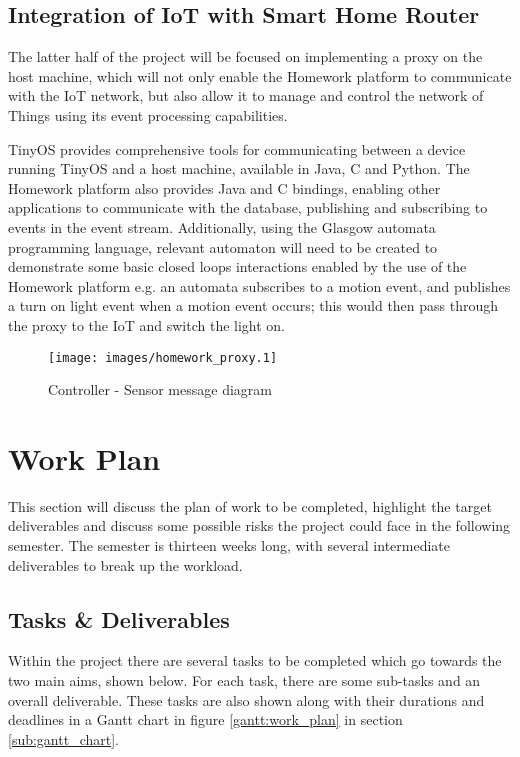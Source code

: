 \documentclass{mprop}
\begin{document}

\subsection{Integration of IoT with Smart Home Router} %
\label{sub:implementation_of_iot_on_smart_home_router}
The latter half of the project will be focused on implementing a proxy on the host machine, which will not only enable the Homework platform to communicate with the IoT network, but also allow it to manage and control the network of Things using its event processing capabilities. 

TinyOS provides comprehensive tools for communicating between a device running TinyOS and a host machine, available in Java, C and Python. The Homework platform also provides Java and C bindings, enabling other applications to communicate with the database, publishing and subscribing to events in the event stream. Additionally, using the Glasgow automata programming language, relevant automaton will need to be created to demonstrate some basic closed loops interactions enabled by the use of the Homework platform e.g. an automata subscribes to a motion event, and publishes a turn on light event when a motion event occurs; this would then pass through the proxy to the IoT and switch the light on.


\begin{figure}[h!]
\centering
\texttt{[image: images/homework\_proxy.1]}
\caption{Controller - Sensor message diagram}
\label{fig:sequence_diagram}
\end{figure}

\section{Work Plan}
This section will discuss the plan of work to be completed, highlight the target deliverables and discuss some possible risks the project could face in the following semester. The semester is thirteen weeks long, with several intermediate deliverables to break up the workload.


\subsection{Tasks \& Deliverables} %
\label{sub:deliverables}
Within the project there are several tasks to be completed which go towards the two main aims, shown below. For each task, there are some sub-tasks and an overall deliverable. These tasks are also shown along with their durations and deadlines in a Gantt chart in figure \ref{gantt:work_plan} in section \ref{sub:gantt_chart}. 
\end{document}
